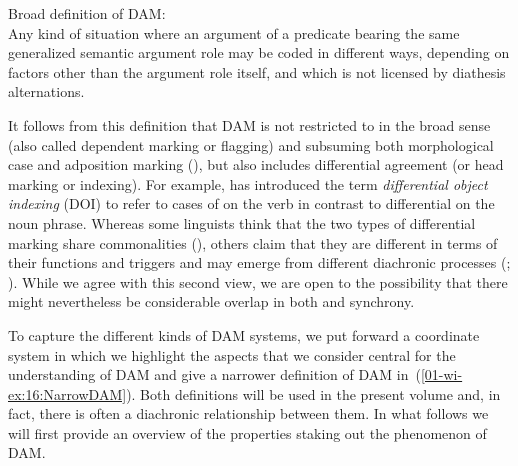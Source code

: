 \documentclass[output=paper]{LSP/langsci}
\begin{document}
\ea\label{01-wi-ex:1:DefinitionsDAM}
Broad definition of DAM:\\
Any kind of situation where an argument of a predicate bearing the same generalized semantic argument role may be coded in different ways, depending on factors other than the argument role itself, and which is not licensed by diathesis alternations.
\z

\noindent It follows from this definition that DAM is not restricted to  in the broad sense (also called dependent marking or flagging) and subsuming both morphological case and adposition marking (\cf \citealt{Haspelmath2005Argument}), but also includes differential agreement (or head marking or indexing). 
For example, \citet{Iemmolo2011Towards} has introduced the term \textit{differential object indexing} (DOI) to refer to cases of  on the verb in contrast to differential  on the noun phrase. 
Whereas some linguists think that the two types of differential marking share commonalities (\eg \citealt[1--2]{Dalrympleetal2011Objects}), others claim that they are different in terms of their functions and triggers and may emerge from different diachronic processes (\citealt[5]{deHoopetal2008Cross-linguistic}; \citealt{Iemmoloetal2012Differential}). 
While we agree with this second view, we are open to the possibility that there might nevertheless be considerable overlap in both  and synchrony. 

To capture the different kinds of DAM systems, we put forward a coordinate system in which we highlight the aspects that we consider central for the understanding of DAM and give a narrower definition of DAM in~(\ref{01-wi-ex:16:NarrowDAM}). 
Both definitions will be used in the present volume and, in fact, there is often a diachronic relationship between them.
In what follows we will first provide an overview of the properties staking out the phenomenon of DAM. 
\end{document}
